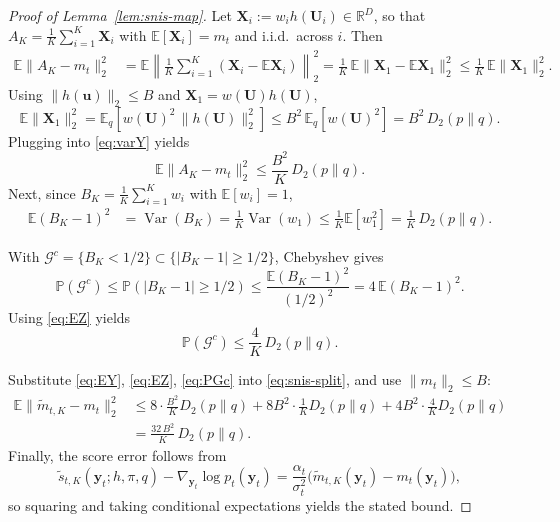 \documentclass[12pt]{article}
\theoremstyle{definition} %
\newcommand{\Var}{\operatorname{Var}}
\newcommand{\R}{\mathbb{R}}
\renewcommand{\P}{\ensuremath{\mathbb{P}}} %
\newcommand{\y}{\bm y}
\providecommand{\E}{\mathbb{E}}
\begin{document}
\begin{proof}[Proof of Lemma~\ref{lem:snis-map}]
Let $\bm X_i:=w_i h(\bm U_i)\in\R^D$, so that
$A_K=\frac1K\sum_{i=1}^K \bm X_i$ with $\E[\bm X_i]=m_t$ and i.i.d.\ across $i$. Then
\begin{align}
\E\|A_K-m_t\|_2^2
&=\E\left\|\frac1K\sum_{i=1}^K (\bm X_i-\E \bm X_i)\right\|_2^2
=\frac{1}{K}\,\E\|\bm X_1-\E \bm X_1\|_2^2
\le \frac{1}{K}\,\E\|\bm X_1\|_2^2.
\label{eq:varY}
\end{align}
Using $\|h(\bm u)\|_2\le B$ and $\bm X_1=w(\bm U)h(\bm U)$,
\[
\E\|\bm X_1\|_2^2
=\E_q\!\left[w(\bm U)^2\,\|h(\bm U)\|_2^2\right]
\le B^2\,\E_q[w(\bm U)^2]
=B^2\,D_2(p\|q).
\]
Plugging into \eqref{eq:varY} yields
\begin{equation}
\label{eq:EY}
\E\|A_K-m_t\|_2^2
\le \frac{B^2}{K}\,D_2(p\|q).
\end{equation}
Next, since $B_K=\frac1K\sum_{i=1}^K w_i$ with $\E[w_i]=1$,
\begin{align}
\E(B_K-1)^2
&=\Var(B_K)
=\frac{1}{K}\Var(w_1)
\le \frac{1}{K}\E[w_1^2]
=\frac{1}{K}\,D_2(p\|q).
\label{eq:EZ}
\end{align}

With $\mathcal{G}^c=\{B_K<1/2\}\subset\{|B_K-1|\ge 1/2\}$, Chebyshev gives
\[
\P(\mathcal{G}^c)\le \P(|B_K-1|\ge 1/2)\le \frac{\E(B_K-1)^2}{(1/2)^2}=4\,\E(B_K-1)^2.
\]
Using \eqref{eq:EZ} yields
\begin{equation}
\label{eq:PGc}
\P(\mathcal{G}^c)\le \frac{4}{K}\,D_2(p\|q).
\end{equation}

Substitute \eqref{eq:EY}, \eqref{eq:EZ}, \eqref{eq:PGc} into \eqref{eq:snis-split}, and use $\|m_t\|_2\le B$:
\begin{align*}
\E\|\widetilde m_{t,K}-m_t\|_2^2
&\le 8\cdot \frac{B^2}{K}D_2(p\|q)
+8 B^2\cdot \frac{1}{K}D_2(p\|q)
+4B^2\cdot \frac{4}{K}D_2(p\|q) \\
&= \frac{32\,B^2}{K}\,D_2(p\|q).
\end{align*}
Finally, the score error follows from
\[
\widetilde s_{t,K}(\y_t;h,\pi,q)-\nabla_{\y_t}\log p_t(\y_t)
=\frac{\alpha_t}{\sigma_t^2}\big(\widetilde m_{t,K}(\y_t)-m_t(\y_t)\big),
\]
so squaring and taking conditional expectations yields the stated bound.
\end{proof}




\end{document}
